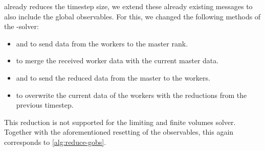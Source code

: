 \begin{itemize}
  \exahype{} already reduces the timestep size, we extend these already existing \mpi{} messages to also include the global observables.
  For this, we changed the following methods of the \dg{}-solver:
  \begin{itemize}
  \item {} and  to send data from the workers to the master rank.
  \item {} to merge the received worker data with the current master data. 
  \item {} and  to send the reduced data from the master to the workers.
  \item {} to overwrite the current data of the workers with the reductions from the previous timestep.
  \end{itemize}
  This reduction is not supported for the limiting and finite volumes solver.
  Together with the aforementioned resetting of the observables, this again corresponds to \cref{alg:reduce-gobs}.
\end{itemize}

